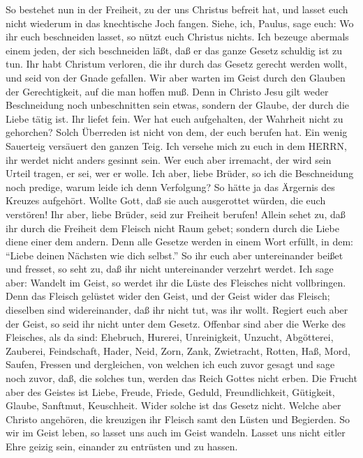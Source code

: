  So bestehet nun in der Freiheit, zu der uns Christus
befreit hat, und lasset euch nicht wiederum in das knechtische Joch
fangen.  Siehe, ich, Paulus, sage euch: Wo ihr euch
beschneiden lasset, so nützt euch Christus nichts.  Ich
bezeuge abermals einem jeden, der sich beschneiden läßt, daß er das
ganze Gesetz schuldig ist zu tun.  Ihr habt Christum
verloren, die ihr durch das Gesetz gerecht werden wollt, und seid von
der Gnade gefallen.  Wir aber warten im Geist durch den
Glauben der Gerechtigkeit, auf die man hoffen muß.  Denn in
Christo Jesu gilt weder Beschneidung noch unbeschnitten sein etwas,
sondern der Glaube, der durch die Liebe tätig ist.  Ihr
liefet fein. Wer hat euch aufgehalten, der Wahrheit nicht zu gehorchen?
 Solch Überreden ist nicht von dem, der euch berufen hat.
 Ein wenig Sauerteig versäuert den ganzen Teig.
 Ich versehe mich zu euch in dem HERRN, ihr werdet nicht
anders gesinnt sein. Wer euch aber irremacht, der wird sein Urteil
tragen, er sei, wer er wolle.  Ich aber, liebe Brüder, so
ich die Beschneidung noch predige, warum leide ich denn Verfolgung? So
hätte ja das Ärgernis des Kreuzes aufgehört.  Wollte Gott,
daß sie auch ausgerottet würden, die euch verstören!  Ihr
aber, liebe Brüder, seid zur Freiheit berufen! Allein sehet zu, daß ihr
durch die Freiheit dem Fleisch nicht Raum gebet; sondern durch die Liebe
diene einer dem andern.  Denn alle Gesetze werden in einem
Wort erfüllt, in dem: ``Liebe deinen Nächsten wie dich selbst.''
 So ihr euch aber untereinander beißet und fresset, so seht
zu, daß ihr nicht untereinander verzehrt werdet.  Ich sage
aber: Wandelt im Geist, so werdet ihr die Lüste des Fleisches nicht
vollbringen.  Denn das Fleisch gelüstet wider den Geist,
und der Geist wider das Fleisch; dieselben sind widereinander, daß ihr
nicht tut, was ihr wollt.  Regiert euch aber der Geist, so
seid ihr nicht unter dem Gesetz.  Offenbar sind aber die
Werke des Fleisches, als da sind: Ehebruch, Hurerei, Unreinigkeit,
Unzucht,  Abgötterei, Zauberei, Feindschaft, Hader, Neid,
Zorn, Zank, Zwietracht, Rotten, Haß, Mord,  Saufen, Fressen
und dergleichen, von welchen ich euch zuvor gesagt und sage noch zuvor,
daß, die solches tun, werden das Reich Gottes nicht erben. 
Die Frucht aber des Geistes ist Liebe, Freude, Friede, Geduld,
Freundlichkeit, Gütigkeit, Glaube, Sanftmut, Keuschheit. 
Wider solche ist das Gesetz nicht.  Welche aber Christo
angehören, die kreuzigen ihr Fleisch samt den Lüsten und Begierden.
 So wir im Geist leben, so lasset uns auch im Geist
wandeln.  Lasset uns nicht eitler Ehre geizig sein,
einander zu entrüsten und zu hassen.


